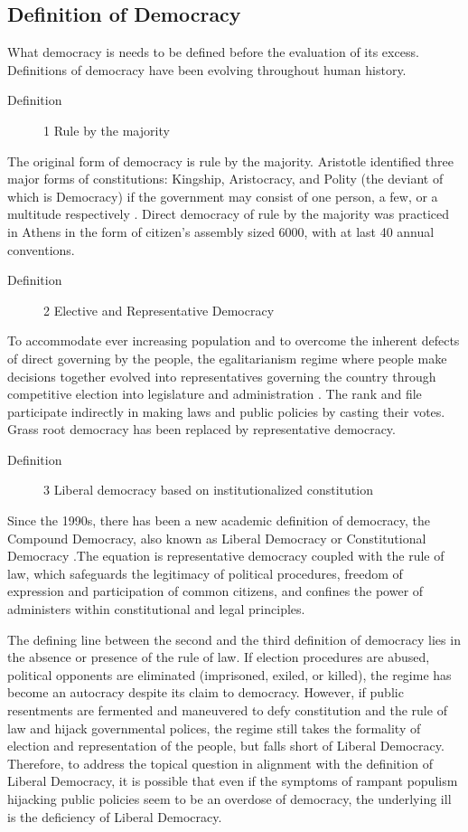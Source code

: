 \documentclass{scrartcl}
\begin{document}
\subsection*{Definition of Democracy}

What democracy is needs to be defined before the evaluation of its
excess. Definitions of democracy have been evolving throughout human
history. 
\begin{description}
\item [{Definition}] 1 Rule by the majority
\end{description}
The original form of democracy is rule by the majority. Aristotle
identified three major forms of constitutions: Kingship, Aristocracy,
and Polity (the deviant of which is Democracy) if the government may
consist of one person, a few, or a multitude respectively \autocite{arispol}.
Direct democracy of rule by the majority was practiced in Athens in
the form of citizen's assembly sized 6000, with at last 40 annual
conventions. 
\begin{description}
\item [{Definition}] 2 Elective and Representative Democracy
\end{description}
To accommodate ever increasing population and to overcome the inherent
defects of direct governing by the people, the egalitarianism regime
where people make decisions together evolved into representatives
governing the country through competitive election into legislature
and administration \autocite{capsocdem}. The rank and file participate
indirectly in making laws and public policies by casting their votes.
Grass root democracy has been replaced by representative democracy. 
\begin{description}
\item [{Definition}] 3 Liberal democracy based on institutionalized constitution
\end{description}
Since the 1990s, there has been a new academic definition of democracy,
the Compound Democracy, also known as Liberal Democracy or Constitutional
Democracy \autocite{Bao2018}.The equation is representative democracy
coupled with the rule of law, which safeguards the legitimacy of political
procedures, freedom of expression and participation of common citizens,
and confines the power of administers within constitutional and legal
principles. 

\bigskip{}

The defining line between the second and the third definition of democracy
lies in the absence or presence of the rule of law. If election procedures
are abused, political opponents are eliminated (imprisoned, exiled,
or killed), the regime has become an autocracy despite its claim to
democracy. However, if public resentments are fermented and maneuvered
to defy constitution and the rule of law and hijack governmental polices,
the regime still takes the formality of election and representation
of the people, but falls short of Liberal Democracy. Therefore, to
address the topical question in alignment with the definition of Liberal
Democracy, it is possible that even if the symptoms of rampant populism
hijacking public policies seem to be an overdose of democracy, the
underlying ill is the deficiency of Liberal Democracy.
\end{document}
